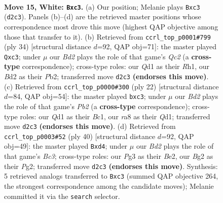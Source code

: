 \documentclass[11pt]{article}
\begin{document}
\clearpage

\begin{figure}[p]\centering
\begin{subfigure}{0.46\textwidth}\centering
\resizebox{\linewidth}{!}{%
\newchessgame
\chessboard[
  setfen={rnb1q1k1/pp2r1pp/2p1pn2/4Np2/2PP4/2b1P1P1/P2B1PBP/1R1QR1K1 w - - 2 15},
  showmover=false,
  pgfstyle=straightmove, color=movearrow, markmove={d2-c3}
]}
\caption{}
\end{subfigure}\hfill
\begin{subfigure}{0.46\textwidth}\centering
\resizebox{\linewidth}{!}{%
\newchessgame
\chessboard[
  setfen={r1b1q1k1/1p2rpp1/2p2n1p/p3Np1P/2BP1P2/2b1P3/PPQ3P1/K1R4R w - - 0 18},
  showmover=false,
  pgfstyle=straightmove, color=movearrow, markmove={c2-c3}
]}
\caption{}
\end{subfigure}
\\[4pt]
\begin{subfigure}{0.46\textwidth}\centering
\resizebox{\linewidth}{!}{%
\newchessgame
\chessboard[
  setfen={rn1q1rk1/pp3ppp/2p2n2/3bN3/3Pp3/2b3P1/PP2PPBP/R1BQ1RK1 w - - 0 12},
  showmover=false,
  pgfstyle=straightmove, color=movearrow, markmove={b2-c3}
]}
\caption{}
\end{subfigure}\hfill
\begin{subfigure}{0.46\textwidth}\centering
\resizebox{\linewidth}{!}{%
\newchessgame
\chessboard[
  setfen={r1r1n1k1/4pp1p/1q1p2p1/pP1Pn3/2pbP3/N1B5/1PQ1BPPP/R4RK1 w - - 6 21},
  showmover=false,
  pgfstyle=straightmove, color=movearrow, markmove={c3-d4}
]}
\caption{}
\end{subfigure}
\caption{\textbf{Move 15, White: \texttt{Bxc3}.} (a) Our position; Melanie plays \texttt{Bxc3} (\texttt{d2c3}). Panels (b)--(d) are the retrieved master positions whose correspondence most drove this move (highest QAP objective among those that transfer to it). (b) Retrieved from \texttt{ccrl\_top\_p0001\#799} (ply 34) [structural distance $d$=92, QAP obj=71]: the master played \texttt{Qxc3}; under $\mu$ our \emph{Bd2} plays the role of that game's \emph{Qc2} (a \textbf{cross-type} correspondence); cross-type roles: our \emph{Q}d1 as their \emph{R}h1, our \emph{B}d2 as their \emph{P}b2; transferred move \texttt{d2c3} \textbf{(endorses this move)}. (c) Retrieved from \texttt{ccrl\_top\_p0000\#300} (ply 22) [structural distance $d$=84, QAP obj=54]: the master played \texttt{bxc3}; under $\mu$ our \emph{Bd2} plays the role of that game's \emph{Pb2} (a \textbf{cross-type} correspondence); cross-type roles: our \emph{Q}d1 as their \emph{B}c1, our \emph{r}a8 as their \emph{Q}d1; transferred move \texttt{d2c3} \textbf{(endorses this move)}. (d) Retrieved from \texttt{ccrl\_top\_p0003\#52} (ply 40) [structural distance $d$=92, QAP obj=49]: the master played \texttt{Bxd4}; under $\mu$ our \emph{Bd2} plays the role of that game's \emph{Bc3}; cross-type roles: our \emph{P}g3 as their \emph{B}e2, our \emph{B}g2 as their \emph{P}g2; transferred move \texttt{d2c3} \textbf{(endorses this move)}. Synthesis: 5 retrieved analogs transferred to \texttt{Bxc3} (summed QAP objective 264, the strongest correspondence among the candidate moves); Melanie committed it via the \texttt{search} selector.}
\label{fig:thought-m28}
\end{figure}
\end{document}
